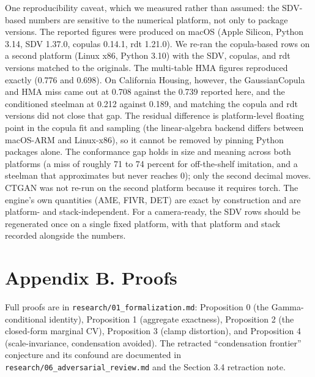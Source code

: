 One reproducibility caveat, which we measured rather than assumed: the
SDV-based numbers are sensitive to the numerical platform, not only to
package versions. The reported figures were produced on macOS (Apple
Silicon, Python 3.14, SDV 1.37.0, copulas 0.14.1, rdt 1.21.0). We re-ran
the copula-based rows on a second platform (Linux x86, Python 3.10) with
the SDV, copulas, and rdt versions matched to the originals. The
multi-table HMA figures reproduced exactly (0.776 and 0.698). On
California Housing, however, the GaussianCopula and HMA miss came out at
0.708 against the 0.739 reported here, and the conditioned steelman at
0.212 against 0.189, and matching the copula and rdt versions did not
close that gap. The residual difference is platform-level floating point
in the copula fit and sampling (the linear-algebra backend differs
between macOS-ARM and Linux-x86), so it cannot be removed by pinning
Python packages alone. The conformance gap holds in size and meaning
across both platforms (a miss of roughly 71 to 74 percent for
off-the-shelf imitation, and a steelman that approximates but never
reaches 0); only the second decimal moves. CTGAN was not re-run on the
second platform because it requires torch. The engine's own quantities
(AME, FIVR, DET) are exact by construction and are platform- and
stack-independent. For a camera-ready, the SDV rows should be
regenerated once on a single fixed platform, with that platform and
stack recorded alongside the numbers.

\hypertarget{appendix-b.-proofs}{%
\section{Appendix B. Proofs}\label{appendix-b.-proofs}}

Full proofs are in \texttt{research/\allowbreak{}01\_\allowbreak{}formalization.md}: Proposition 0
(the Gamma-conditional identity), Proposition 1 (aggregate exactness),
Proposition 2 (the closed-form marginal CV), Proposition 3 (clamp
distortion), and Proposition 4 (scale-invariance, condensation avoided).
The retracted ``condensation frontier'' conjecture and its confound are
documented in \texttt{research/\allowbreak{}06\_\allowbreak{}adversarial\_\allowbreak{}review.md} and the
Section 3.4 retraction note.
